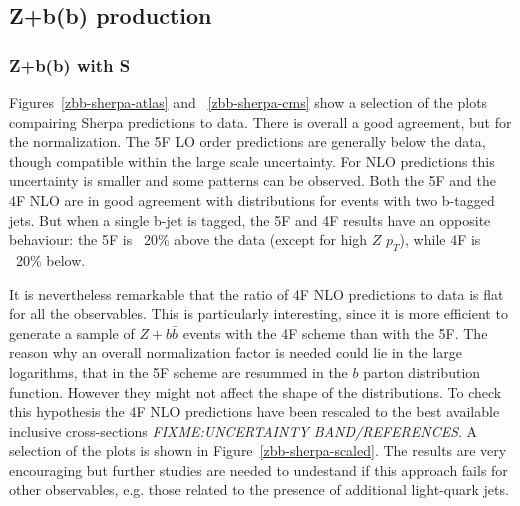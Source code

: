 \documentclass[11pt]{cernrep} \usepackage{graphicx,epsfig} 
\newcommand{\Sherpa}{S\protect\scalebox{0.8}{HERPA}\xspace}
\newcommand{\pt}{\ensuremath{p_{T}}\xspace}
\begin{document}
\subsection{Z+b(b) production \label{Zbb}}

\subsubsection{Z+b(b) with \Sherpa}

Figures~\ref{zbb-sherpa-atlas} and ~\ref{zbb-sherpa-cms} show a selection of the plots compairing Sherpa predictions to data. 
There is overall a good agreement, but for the normalization. The 5F LO order predictions are generally below the data, though compatible within
the large scale uncertainty. For NLO predictions this uncertainty is smaller and some patterns can be
observed. Both the 5F and the 4F NLO are in good agreement with distributions for events with two b-tagged jets. 
But when a single b-jet is tagged, the 5F and 4F results have an opposite 
behaviour: the 5F is ~20\% above the data (except for high $Z$ \pt), while 4F is ~20\% below. 

It is nevertheless remarkable that the ratio of 4F NLO predictions to data is flat for all the observables. This is
particularly interesting, since it is more efficient to generate a sample of $Z+b\bar{b}$ events with the 4F scheme than 
with the 5F. The reason why an overall normalization factor is needed could lie in the large logarithms, that in the 5F
scheme are resummed in the $b$ parton distribution function. However they might not affect the shape of the distributions. To check this hypothesis the 4F NLO
predictions have been rescaled to the best available inclusive cross-sections {\em FIXME:UNCERTAINTY BAND/REFERENCES}. A selection of the plots is
shown in Figure~\ref{zbb-sherpa-scaled}. The results are very encouraging but further studies are needed to undestand
if this approach fails for other observables, e.g. those related to the presence of additional light-quark jets.  
\end{document}
